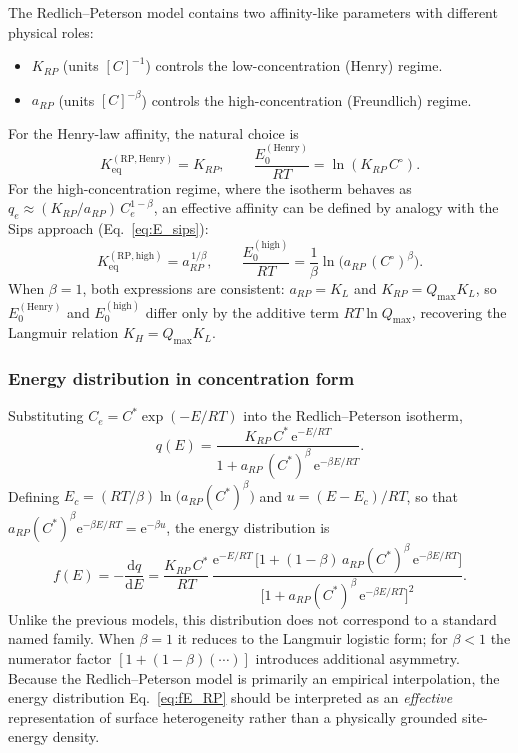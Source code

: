 	The Redlich--Peterson model contains two affinity-like parameters with
	different physical roles:
	\begin{itemize}
		\item $K_{RP}$ (units $[C]^{-1}$) controls the low-concentration
		(Henry) regime.
		\item $a_{RP}$ (units $[C]^{-\beta}$) controls the
		high-concentration (Freundlich) regime.
	\end{itemize}
	For the Henry-law affinity, the natural choice is
	\begin{equation}
		K_{\mathrm{eq}}^{\mathrm{(RP,Henry)}} = K_{RP},
		\qquad
		\frac{E_0^{\mathrm{(Henry)}}}{RT}
		= \ln(K_{RP}\,C^\circ).
		\label{eq:E_RP_henry}
	\end{equation}
	For the high-concentration regime, where the isotherm behaves as
	$q_e \approx (K_{RP}/a_{RP})\,C_e^{1-\beta}$, an effective affinity
	can be defined by analogy with the Sips approach
	(Eq.~\eqref{eq:E_sips}):
	\begin{equation}
		K_{\mathrm{eq}}^{\mathrm{(RP,high)}} = a_{RP}^{\,1/\beta},
		\qquad
		\frac{E_0^{\mathrm{(high)}}}{RT}
		= \frac{1}{\beta}
		\ln\!\bigl(a_{RP}\,(C^\circ)^{\beta}\bigr).
		\label{eq:E_RP_high}
	\end{equation}
	When $\beta = 1$, both expressions are consistent: $a_{RP} = K_L$
	and $K_{RP} = Q_{\max}K_L$, so $E_0^{\mathrm{(Henry)}}$ and
	$E_0^{\mathrm{(high)}}$ differ only by the additive term
	$RT\ln Q_{\max}$, recovering the Langmuir relation $K_H = Q_{\max}K_L$.

	\subsubsection{Energy distribution in concentration form}

	Substituting $C_e = C^{\ast}\exp(-E/RT)$ into the Redlich--Peterson
	isotherm,
	\begin{equation}
		q(E)
		= \frac{K_{RP}\,C^{\ast}\,\mathrm{e}^{-E/RT}}
		{1 + a_{RP}\,(C^{\ast})^{\beta}\,
		\mathrm{e}^{-\beta E/RT}}.
		\label{eq:qE_RP}
	\end{equation}
	Defining $E_c = (RT/\beta)\ln\!\bigl(a_{RP}(C^{\ast})^{\beta}\bigr)$
	and $u = (E - E_c)/RT$, so that
	$a_{RP}(C^{\ast})^{\beta}\mathrm{e}^{-\beta E/RT} = \mathrm{e}^{-\beta u}$,
	the energy distribution is
	\begin{equation}
		f(E) = -\frac{\mathrm{d}q}{\mathrm{d}E}
		= \frac{K_{RP}\,C^{\ast}}{RT}\,
		\frac{\mathrm{e}^{-E/RT}\,
		\bigl[1 + (1-\beta)\,a_{RP}(C^{\ast})^{\beta}\,
		\mathrm{e}^{-\beta E/RT}\bigr]}
		{\bigl[1 + a_{RP}(C^{\ast})^{\beta}\,
		\mathrm{e}^{-\beta E/RT}\bigr]^{2}}.
		\label{eq:fE_RP}
	\end{equation}
	Unlike the previous models, this distribution does not correspond to
	a standard named family. When $\beta = 1$ it reduces to the Langmuir
	logistic form; for $\beta < 1$ the numerator factor
	$[1 + (1-\beta)(\cdots)]$ introduces additional asymmetry. Because
	the Redlich--Peterson model is primarily an empirical interpolation,
	the energy distribution Eq.~\eqref{eq:fE_RP} should be interpreted
	as an \emph{effective} representation of surface heterogeneity
	rather than a physically grounded site-energy density.

